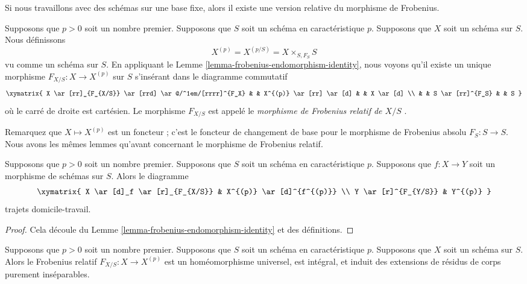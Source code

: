 \noindent
Si nous travaillons avec des schémas sur une base fixe,
alors il existe une version relative du morphisme de Frobenius.

\begin{definition}
\label{definition-relative-frobenius}
Supposons que $p > 0$ soit un nombre premier. Supposons que $S$ soit un schéma en
caractéristique $p$. Supposons que $X$ soit un schéma sur $S$. Nous définissons
$$
X^{(p)} = X^{(p/S)} = X \times_{S, F_S} S
$$
vu comme un schéma sur $S$. En appliquant le Lemme
\ref{lemma-frobenius-endomorphism-identity}, nous voyons
qu'il existe un unique morphisme $F_{X/S} : X
\longrightarrow X^{(p)}$ sur $S$ s'insérant dans le diagramme commutatif
$$
\xymatrix{
X \ar[rr]_{F_{X/S}} \ar[rrd] \ar@/^1em/[rrrr]^{F_X}
& & X^{(p)} \ar[rr] \ar[d] & & X \ar[d] \\
& & S \ar[rr]^{F_S} & & S
}
$$
où le carré de droite est cartésien. Le morphisme $F_{X/S}$
est appelé le {\it morphisme de Frobenius relatif de $X/S$ }.
\end{definition}

\noindent
Remarquez que $X \mapsto X^{(p)}$ est un foncteur ; c'est le foncteur de
changement de base pour le morphisme de Frobenius absolu $F_S : S \to S$. Nous
avons les mêmes lemmes qu'avant concernant le morphisme de Frobenius relatif.

\begin{lemma}
\label{lemma-relative-frobenius-endomorphism-identity}
Supposons que $p > 0$ soit un nombre premier. Supposons que
$S$ soit un schéma en caractéristique $p$. Supposons que $f : X
\to Y$ soit un morphisme de schémas sur $S$. Alors le diagramme
$$
\xymatrix{
X \ar[d]_f \ar[r]_{F_{X/S}} & X^{(p)} \ar[d]^{f^{(p)}} \\
Y \ar[r]^{F_{Y/S}} & Y^{(p)}
}
$$
trajets domicile-travail.
\end{lemma}

\begin{proof}
Cela découle du Lemme
\ref{lemma-frobenius-endomorphism-identity} et des définitions.
\end{proof}

\begin{lemma}
\label{lemma-relative-frobenius}
Supposons que $p > 0$ soit un nombre premier. Supposons que
$S$ soit un schéma en caractéristique $p$. Supposons que $X$
soit un schéma sur $S$. Alors le Frobenius relatif $F_{X/S} : X
\to X^{(p)}$ est un homéomorphisme universel, est intégral, et
induit des extensions de résidus de corps purement inséparables.
\end{lemma}

